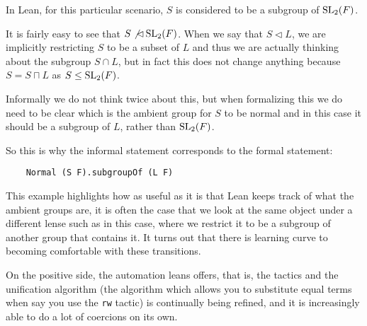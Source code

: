 \begin{remark}
    \label{lattice}
    In Lean, for this particular scenario, $S$ is considered to be a subgroup of $\operatorname{SL}_2(F)$. 
    
    It is fairly easy to see that $S \not\lhd \operatorname{SL}_2(F)$. When we say that $S \lhd L$, we are implicitly restricting $S$ to be a subset of $L$ and thus we are actually thinking about the subgroup $S \cap L$,
    but in fact this does not change anything because $S = S \sqcap L$ as $S \le \operatorname{SL}_2(F)$.

    Informally we do not think twice about this, but when formalizing this we do need to be clear which is the ambient group for $S$ to be normal and in this case it should be a subgroup of $L$, rather than $\operatorname{SL}_2(F)$.
    
    So this is why the informal statement corresponds to the formal statement:

    \begin{footnotesize}
    \begin{verbatim}
    Normal (S F).subgroupOf (L F) 
    \end{verbatim}
    \end{footnotesize}

    This example highlights how as useful as it is that Lean keeps track of what the ambient groups are, it is often the case that we look at the same object under a different lense such as in this case, where we restrict it to be a 
    subgroup of another group that contains it. It turns out that there is learning curve to becoming comfortable with these transitions.
    
    On the positive side, the automation leans offers, that is, the tactics and the unification algorithm (the algorithm which allows you to substitute equal terms when say you use the  \texttt{rw} tactic) is continually being refined, 
    and it is increasingly able to do a lot of coercions on its own.
\end{remark}


